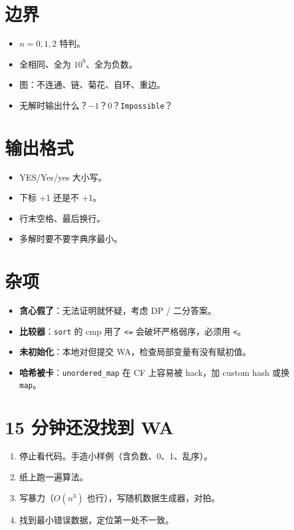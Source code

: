 \documentclass[UTF8,openany,oneside,zihao=-4]{ctexbook}
\begin{document}
\section{边界}

\begin{itemize}
  \item $n=0,1,2$ 特判。
  \item 全相同、全为 $10^9$、全为负数。
  \item 图：不连通、链、菊花、自环、重边。
  \item 无解时输出什么？$-1$？$0$？\texttt{Impossible}？
\end{itemize}

\section{输出格式}

\begin{itemize}
  \item YES/Yes/yes 大小写。
  \item 下标 +1 还是不 +1。
  \item 行末空格、最后换行。
  \item 多解时要不要字典序最小。
\end{itemize}

\section{杂项}

\begin{itemize}
  \item \textbf{贪心假了}：无法证明就怀疑，考虑 DP / 二分答案。
  \item \textbf{比较器}：\lstinline|sort| 的 cmp 用了 \lstinline|<=| 会破坏严格弱序，必须用 \lstinline|<|。
  \item \textbf{未初始化}：本地对但提交 WA，检查局部变量有没有赋初值。
  \item \textbf{哈希被卡}：\lstinline|unordered_map| 在 CF 上容易被 hack，加 custom hash 或换 \lstinline|map|。
\end{itemize}

\section{15 分钟还没找到 WA}

\begin{enumerate}
  \item 停止看代码。手造小样例（含负数、0、1、乱序）。
  \item 纸上跑一遍算法。
  \item 写暴力（$O(n^3)$ 也行），写随机数据生成器，对拍。
  \item 找到最小错误数据，定位第一处不一致。
\end{enumerate}
\end{document}
